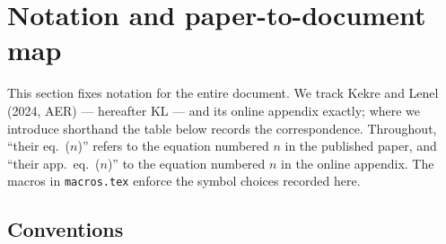 \section{Notation and paper-to-document map}
\label{sec:notation}

This section fixes notation for the entire document. We track Kekre and Lenel
(2024, AER) --- hereafter KL --- and its online appendix exactly; where we
introduce shorthand the table below records the correspondence. Throughout,
``their eq.~(\(n\))'' refers to the equation numbered \(n\) in the published
paper, and ``their app.~eq.~(\(n\))'' to the equation numbered \(n\) in the
online appendix. The macros in \texttt{macros.tex} enforce the symbol choices
recorded here.

\subsection{Conventions}

